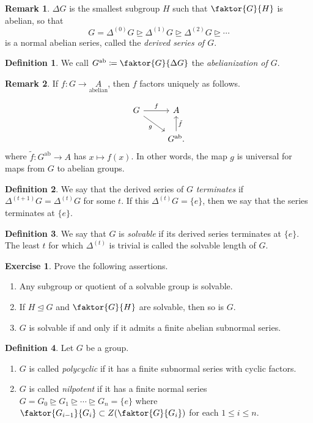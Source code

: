 \documentclass[10pt,letterpaper,cm]{nupset}
\theoremstyle{definition}
\newtheorem*{definition}{Definition}
\newtheorem{remark}{Remark}
\newtheorem{exercise}{Exercise}
\newcommand{\1}{\mathbf{1}}
\newcommand{\0}{\vec 0}
\DeclareMathOperator{\ab}{ab}
\begin{document}
\begin{remark}
$\Delta G$ is the smallest subgroup $H$ such that $\faktor{G}{H}$ is abelian, so that $$G = \Delta^{(0)}G \unrhd \Delta^{(1)}G \unrhd \Delta^{(2)}G \unrhd \cdots $$ is a normal abelian series, called the \textit{derived series of $G$}.
\end{remark}

\begin{definition}
We call $G^{\ab}\coloneqq  \faktor{G}{\Delta G}$ the \textit{abelianization of $G$}.
\end{definition}

\begin{remark}
If $f: G \to \underset{\text{abelian}} A$, then $f$ factors uniquely as follows.

\[ \begin{tikzcd}
G \arrow[r, "f"] \arrow[dr, "g", swap] & A \\%
 & G^{\ab}\arrow[u, "\tilde{f}", swap].
\end{tikzcd}
\]
where $\tilde{f}: G^{\ab} \to A$ has $x\mapsto f(x)$.
In other words, the map $g$ is universal for maps from $G$ to abelian groups. 
\end{remark}

\begin{definition}
We say that the derived series of $G$ \textit{terminates} if $\Delta^{(t+1)}G = \Delta^{(t)}G$ for some $t$. If this $\Delta^{(t)}G=\{e\}$, then we say that the series terminates at $\{e\}$.
\end{definition}

\begin{definition}
We say that $G$ is \textit{solvable} if its derived series terminates at $\{e\}$. The least $t$ for which $\Delta^{(t)}$ is trivial is called the solvable length of $G$.
\end{definition}

\begin{exercise}{Prove the following assertions.}
\begin{enumerate}
\item Any subgroup or quotient of a solvable group is solvable.
\item If $H\unlhd G$ and $\faktor{G}{H}$ are solvable, then so is $G$.
\item $G$ is solvable  if and only if it admits a finite abelian subnormal series. 
\end{enumerate}
\end{exercise}

\begin{definition}{Let $G$ be a group.}
\begin{enumerate}
\item $G$ is called \textit{polycyclic} if it has a finite subnormal series with cyclic factors.
\item $G$ is called \textit{nilpotent} if it has a finite normal series  $G =G_0 \unrhd G_1 \unrhd \cdots \unrhd G_n = \{e\}$ where $\faktor{G_{i-1}}{G_i}\subset Z(\faktor{G}{G_i})$ for each $1\leq i\leq n$.
\end{enumerate}
\end{definition}
\end{document}
